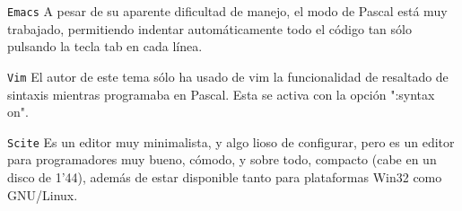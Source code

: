 {\tt Emacs} A pesar de su aparente dificultad de manejo, el modo de Pascal
está muy trabajado, permitiendo indentar automáticamente todo el código
tan sólo pulsando la tecla tab en cada línea.

{\tt Vim} El autor de este tema  sólo ha usado de vim la funcionalidad
de resaltado de sintaxis mientras programaba en Pascal. Esta se activa
con la opción ":syntax on".

{\tt Scite} Es un editor muy  minimalista, y algo lioso de configurar,
pero es un editor para programadores  muy bueno, cómodo, y sobre todo,
compacto (cabe en un disco de  1'44), además de estar disponible tanto
para plataformas Win32 como GNU/Linux.

